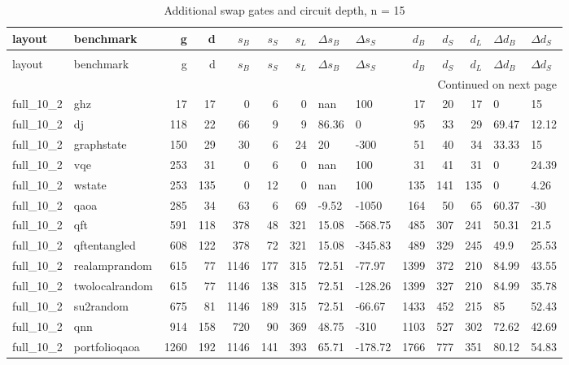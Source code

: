 \begin{longtable}{llrrrrrllrrrll}
\caption{Additional swap gates and circuit depth, n = 15} \label{benchmark-table-15} \\
\toprule
layout & benchmark & g & d & $s_B$ & $s_S$ & $s_L$ & $\Delta s_B$ & $\Delta s_S$ & $d_B$ & $d_S$ & $d_L$ & $\Delta d_B$ & $\Delta d_S$ \\
\midrule
\endfirsthead
\caption[]{Additional swap gates and circuit depth, n = 15} \\
\toprule
layout & benchmark & g & d & $s_B$ & $s_S$ & $s_L$ & $\Delta s_B$ & $\Delta s_S$ & $d_B$ & $d_S$ & $d_L$ & $\Delta d_B$ & $\Delta d_S$ \\
\midrule
\endhead
\midrule
\multicolumn{14}{r}{Continued on next page} \\
\midrule
\endfoot
\bottomrule
\endlastfoot
full\_10\_2 & ghz & 17 & 17 & 0 & 6 & 0 & nan & 100 & 17 & 20 & 17 & 0 & 15 \\
full\_10\_2 & dj & 118 & 22 & 66 & 9 & 9 & 86.36 & 0 & 95 & 33 & 29 & 69.47 & 12.12 \\
full\_10\_2 & graphstate & 150 & 29 & 30 & 6 & 24 & 20 & -300 & 51 & 40 & 34 & 33.33 & 15 \\
full\_10\_2 & vqe & 253 & 31 & 0 & 6 & 0 & nan & 100 & 31 & 41 & 31 & 0 & 24.39 \\
full\_10\_2 & wstate & 253 & 135 & 0 & 12 & 0 & nan & 100 & 135 & 141 & 135 & 0 & 4.26 \\
full\_10\_2 & qaoa & 285 & 34 & 63 & 6 & 69 & -9.52 & -1050 & 164 & 50 & 65 & 60.37 & -30 \\
full\_10\_2 & qft & 591 & 118 & 378 & 48 & 321 & 15.08 & -568.75 & 485 & 307 & 241 & 50.31 & 21.5 \\
full\_10\_2 & qftentangled & 608 & 122 & 378 & 72 & 321 & 15.08 & -345.83 & 489 & 329 & 245 & 49.9 & 25.53 \\
full\_10\_2 & realamprandom & 615 & 77 & 1146 & 177 & 315 & 72.51 & -77.97 & 1399 & 372 & 210 & 84.99 & 43.55 \\
full\_10\_2 & twolocalrandom & 615 & 77 & 1146 & 138 & 315 & 72.51 & -128.26 & 1399 & 327 & 210 & 84.99 & 35.78 \\
full\_10\_2 & su2random & 675 & 81 & 1146 & 189 & 315 & 72.51 & -66.67 & 1433 & 452 & 215 & 85 & 52.43 \\
full\_10\_2 & qnn & 914 & 158 & 720 & 90 & 369 & 48.75 & -310 & 1103 & 527 & 302 & 72.62 & 42.69 \\
full\_10\_2 & portfolioqaoa & 1260 & 192 & 1146 & 141 & 393 & 65.71 & -178.72 & 1766 & 777 & 351 & 80.12 & 54.83 \\

\end{longtable}
